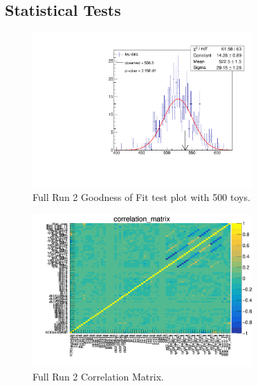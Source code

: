 \chapter{}
\label{append}

\section{Statistical Tests}
\begin{figure}[!htb]
	\centering
	\includegraphics[width=0.75\textwidth]{Figures/gof_plot.pdf}
	\caption{Full Run 2 Goodness of Fit test plot with 500 toys.}
	\label{fig:gofplot}
\end{figure}

\begin{figure}[!htb]
	\centering
	\includegraphics[width=0.75\textwidth]{Figures/correlation_matrix.png}
	\caption{Full Run 2 Correlation Matrix.}
	\label{fig:corrMatrixplot}
\end{figure}


